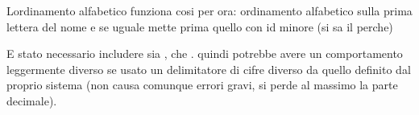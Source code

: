 
\begin{DoxyRefList}
\item[\label{bug__bug000001}%
\Hypertarget{bug__bug000001}%
Global \hyperlink{ordinamento_8c_a3ee60e03d675a4b6c5f3e23b126142cd}{insert\+\_\+key\+\_\+prodotti} (prodotto\+\_\+t $\ast$record, tree\+\_\+node\+\_\+t $\ast$$\ast$n, campo\+\_\+record\+\_\+t campo)]L\textquotesingle{}ordinamento alfabetico funziona cosi\textquotesingle{} per ora\+: ordinamento alfabetico sulla prima lettera del nome e se uguale mette prima quello con id minore (si sa\textquotesingle{} il perche\textquotesingle{})  
\item[\label{bug__bug000002}%
\Hypertarget{bug__bug000002}%
Global \hyperlink{strutture_8c_ad112c9780a37fb8cd6c53e0475fbdc3c}{is\+\_\+ufnum} (char $\ast$stringa)]E\textquotesingle{} stato necessario includere sia , che . quindi potrebbe avere un comportamento leggermente diverso se usato un delimitatore di cifre diverso da quello definito dal proprio sistema (non causa comunque errori gravi, si perde al massimo la parte decimale). 
\end{DoxyRefList}